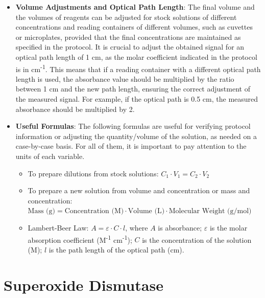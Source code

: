 \documentclass[
  9pt,
  american,
  a5paper,
  extrafontsizes,onecolumn,openright
  ]{memoir}
\makeatletter
\providecommand{\tightlist}{%
  \setlength{\itemsep}{0pt}\setlength{\parskip}{0pt}}
\newcommand{\MemoirChapStyle}{daleif1}
\newcommand{\MemoirPageStyle}{Ruled}
\newlength\widthw %
\newcommand*{\SmallMargins}{
  \setlrmarginsandblock{0.75in}{0.75in}{*}
  \setmarginnotes{0.1in}{0.1in}{0.1in}
 \setulmarginsandblock{0.75in}{0.75in}{*}
  \checkandfixthelayout
  \ch@ngetext
  \clearpage
  \setlength{\widthw}{\textwidth+\marginparsep+\marginparwidth}
  \footnotesatfoot
  \chapterstyle{\MemoirChapStyle}  %
  \pagestyle{\MemoirPageStyle}
}
\makeatother
\begin{document}
\begin{itemize}
\item
  \textbf{Volume Adjustments and Optical Path Length}: The final volume and the volumes of reagents can be adjusted for stock solutions of different concentrations and reading containers of different volumes, such as cuvettes or microplates, provided that the final concentrations are maintained as specified in the protocol. It is crucial to adjust the obtained signal for an optical path length of 1 cm, as the molar coefficient indicated in the protocol is in cm\textsuperscript{-1}. This means that if a reading container with a different optical path length is used, the absorbance value should be multiplied by the ratio between 1 cm and the new path length, ensuring the correct adjustment of the measured signal. For example, if the optical path is 0.5 cm, the measured absorbance should be multiplied by 2.
\item
  \textbf{Useful Formulas}: The following formulas are useful for verifying protocol information or adjusting the quantity/volume of the solution, as needed on a case-by-case basis. For all of them, it is important to pay attention to the units of each variable.

  \begin{itemize}
  \tightlist
  \item
    To prepare dilutions from stock solutions: \(C_1 \cdot V_1 = C_2 \cdot V_2\)
  \item
    To prepare a new solution from volume and concentration or mass and concentration: \(\text{Mass (g)} = \text{Concentration (M)} \cdot \text{Volume (L)} \cdot \text{Molecular Weight (g/mol)}\)
  \item
    Lambert-Beer Law: \(A = \varepsilon \cdot C \cdot l\), where \(A\) is absorbance; \(\varepsilon\) is the molar absorption coefficient (M\textsuperscript{-1} cm\textsuperscript{-1}); \(C\) is the concentration of the solution (M); \(l\) is the path length of the optical path (cm).
  \end{itemize}
\end{itemize}

\chapter{Superoxide Dismutase}\label{superoxide-dismutase}



\backmatter
\SmallMargins
\end{document}
